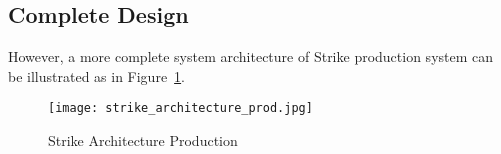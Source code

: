 \documentclass[dareport.tex]{subfiles}
\begin{document}
\subsection{Complete Design}

However, a more complete system architecture of Strike production system can be illustrated as in Figure~\ref{fig:strike_arch_comp}. 

\begin{figure}[h]
\caption{Strike Architecture Production}
\label{fig:strike_arch_comp}
\texttt{[image: strike\_architecture\_prod.jpg]}
\centering
\end{figure}
\end{document}
